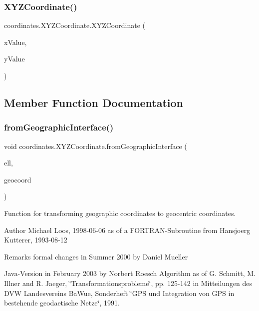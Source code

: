 \subsubsection{\texorpdfstring{X\+Y\+Z\+Coordinate()}{XYZCoordinate()}\hspace{0.1cm}{\footnotesize\ttfamily [3/3]}}
{\footnotesize\ttfamily coordinates.\+X\+Y\+Z\+Coordinate.\+X\+Y\+Z\+Coordinate (\begin{DoxyParamCaption}\item[{double}]{x\+Value,  }\item[{double}]{y\+Value }\end{DoxyParamCaption})}



\subsection{Member Function Documentation}
\mbox{\label{classcoordinates_1_1_x_y_z_coordinate_a8f62090c5d6f6207d1add9af43354cfb}} 
\subsubsection{\texorpdfstring{from\+Geographic\+Interface()}{fromGeographicInterface()}}
{\footnotesize\ttfamily void coordinates.\+X\+Y\+Z\+Coordinate.\+from\+Geographic\+Interface (\begin{DoxyParamCaption}\item[{\hyperlink{classparams_1_1_ellipsoid_parms}{Ellipsoid\+Parms}}]{ell,  }\item[{\hyperlink{classcoordinates_1_1_geographic_coordinate_interface}{Geographic\+Coordinate\+Interface}}]{geocoord }\end{DoxyParamCaption})}



Function for transforming geographic coordinates to geocentric coordinates. 

\begin{DoxyAuthor}{Author}
Michael Loos, 1998-\/06-\/06 as of a F\+O\+R\+T\+R\+A\+N-\/\+Subroutine from Hansjoerg Kutterer, 1993-\/08-\/12 
\end{DoxyAuthor}
\begin{DoxyRemark}{Remarks}
formal changes in Summer 2000 by Daniel Mueller 

Java-\/\+Version in February 2003 by Norbert Roesch Algorithm as of G. Schmitt, M. Illner and R. Jaeger, \char`\"{}\+Transformationsprobleme\char`\"{}, pp. 125-\/142 in Mitteilungen des D\+VW Landesvereins Ba\+Wue, Sonderheft \char`\"{}\+G\+P\+S und Integration
von G\+P\+S in bestehende geodaetische Netze\char`\"{}, 1991. 
\end{DoxyRemark}

